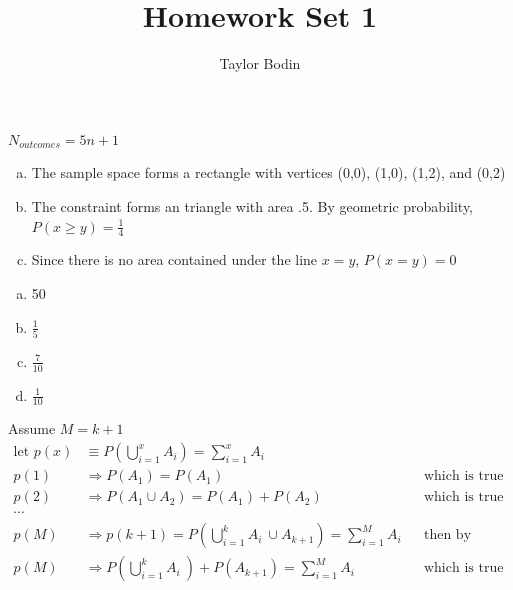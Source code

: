 \documentclass[12pt]{article}
\newenvironment{problem}[2][Problem]{\begin{trivlist}
\item[\hskip \labelsep {\bfseries #1}\hskip \labelsep {\bfseries #2.}]
  \vspace{1 cm}
}{\end{trivlist}}
\begin{document}
\title{Homework Set 1}
\author{Taylor Bodin}
\maketitle
 
\begin{problem}{2.1}
\item%
    $N_{outcomes} = 5n+1$%
\end{problem}

\begin{problem}{2.3}
  \item%
  \begin{enumerate}[a.]
    \item The sample space forms a rectangle with vertices (0,0), (1,0), (1,2), and (0,2)
    \item The constraint forms an triangle with area .5. By geometric probability, $P(x \geq y) = \frac{1}{4}$
    \item Since there is no area contained under the line $x=y$, $P(x=y) = 0$
  \end{enumerate}%
\end{problem}

\begin{problem}{2.5}
\item%
  \begin{enumerate}[a.]
    \item 50
    \item $\frac{1}{5}$
    \item $\frac{7}{10}$
    \item $\frac{1}{10}$
  \end{enumerate}%
\end{problem}

\newpage

\begin{problem}{2.7}
\item Assume $M = k+1$ %
  \begin{align*}
    \textrm{let } p(x) &\equiv P\left( \bigcup_{i=1}^{x} A_i \right) = \sum_{i=1}^{x} A_i \\
    p(1) &\Rightarrow P(A_1) = P(A_1) & & \textrm{which is true by definition} \\
    p(2) &\Rightarrow P(A_1 \cup A_2) = P(A_1) + P(A_2) & & \textrm{which is true by axiom 2} \\
    \cdots \\
    p(M) &\Rightarrow p(k+1) = P\left( \bigcup_{i=1}^{k} A_i\ \cup A_{k+1} \right) = \sum_{i=1}^{M} A_i & & \textrm{then by axiom 2} \\
    p(M) &\Rightarrow P\left( \bigcup_{i=1}^{k} A_i\ \right) + P(A_{k+1}) = \sum_{i=1}^{M} A_i & & \textrm{which is true by definition}
  \end{align*}%
\end{problem}
\end{document}
